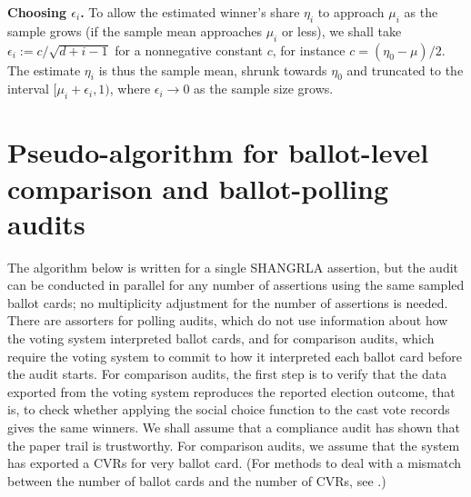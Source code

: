 \documentclass[12pt,runningheads]{llncs}
\begin{document}
{{\bf Choosing $\epsilon_i$.}
To allow the estimated winner's share $\eta_i$ to approach
$\mu_i$ as the sample grows (if the sample mean approaches $\mu_i$ or less),
we shall take $\epsilon_i := c/\sqrt{d+i-1}$ for a nonnegative constant $c$,
for instance $c=(\eta_0-\mu)/2$.
The estimate $\eta_i$ is thus the sample mean,
shrunk towards $\eta_0$ and truncated to the interval $[\mu_i + \epsilon_i, 1)$, where
$\epsilon_i \rightarrow 0$ as the sample size grows.

\section{Pseudo-algorithm for ballot-level comparison and ballot-polling audits}

The algorithm below is written for a single SHANGRLA assertion, but the audit can be conducted in parallel
for any number of assertions using the same sampled ballot cards; no multiplicity adjustment for the number
of assertions is needed.
There are assorters for polling audits, which do not use information about how the voting system interpreted
ballot cards, and for comparison audits, which require the voting system to commit to how it interpreted
each ballot card before the audit starts.
For comparison audits, the first step is to verify that the data exported from the voting system
reproduces the reported election outcome, that is, to check whether applying the social choice function to the
cast vote records gives the same winners.
We shall assume that a compliance audit has shown that the paper trail is trustworthy.
For comparison audits, we assume that the system has exported a CVRs for very ballot card.
(For methods to deal with a mismatch between the number of ballot cards and the number of CVRs, see
\cite{stark20}.)

}
\end{document}
